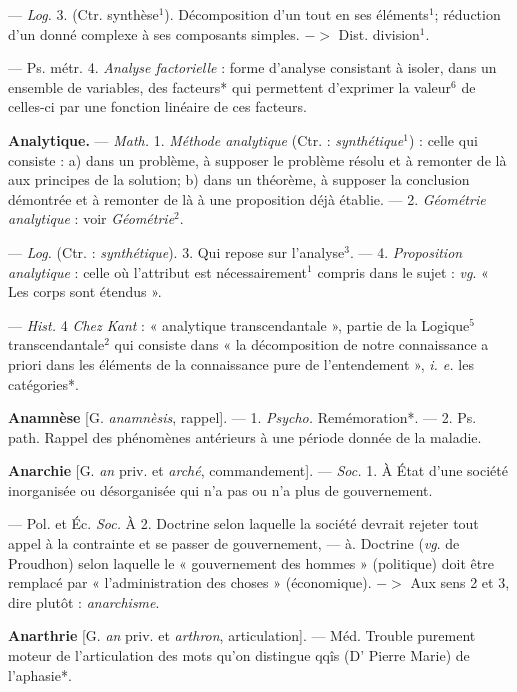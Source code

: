 \begin{itemize}[leftmargin=1cm, label=, itemsep=1pt]
{{{{— \textsf{\textit {Log.}} 3. (Ctr. {\it }synthèse$^1$).
Décomposition d’un tout en ses éléments$^1$; réduction d'un donné
complexe à ses composants simples. $->$ Dist. division$^1$.

— Ps. métr. 4. {\it Analyse factorielle} : forme d'analyse consistant à
isoler, dans un ensemble de variables,
des facteurs* qui permettent d’exprimer la valeur$^6$ de celles-ci par une
fonction linéaire de ces facteurs.

\item {\bf Analytique.} — \textsf{\textit {Math.}} 1. {\it Méthode analytique} (Ctr. : {\it synthétique}$^1$) : celle
qui consiste : a) dans un problème,
à supposer le problème résolu et à
remonter de là aux principes de la
solution; b) dans un théorème, à
supposer la conclusion démontrée et
à remonter de là à une proposition
déjà établie. — 2. {\it Géométrie analytique} : voir {\it Géométrie}$^2$.

— \textsf{\textit {Log.}} (Ctr. : {\it synthétique}). 3. Qui
repose sur l’analyse$^3$. — 4. {\it Proposition analytique} : celle où l’attribut
est nécessairement$^1$ compris dans le
sujet : {\it vg}. « Les corps sont étendus ».

— \textsf{\textit {Hist.}} 4 {\it Chez Kant} : « analytique transcendantale », partie de
la Logique$^5$ transcendantale$^2$ qui
consiste dans « la décomposition de
notre connaissance a priori dans les
éléments de la connaissance pure de
l’entendement », {\it i. e.} les catégories*.

\item {\bf Anamnèse} [G. {\it anamnèsis}, rappel]. —
1. \textsf{\textit {Psycho.}} Remémoration*. — 2. Ps.
path. Rappel des phénomènes antérieurs à une période donnée de la
maladie.

\item {\bf Anarchie} [G. {\it an} priv. et {\it arché}, commandement]. — \textsf{\textit {Soc.}} 1. À État
d’une société inorganisée ou désorganisée qui n’a pas ou n’a plus de
gouvernement.

— Pol. et Éc. \textsf{\textit {Soc.}} À 2. Doctrine
selon laquelle la société devrait
rejeter tout appel à la contrainte et
se passer de gouvernement, — à.
Doctrine ({\it vg}. de Proudhon) selon
laquelle le « gouvernement des
hommes » (politique) doit être remplacé par « l'administration des
choses » (économique). $->$ Aux
sens 2 et 3, dire plutôt : {\it anarchisme}.

\item {\bf Anarthrie} [G. {\it an} priv. et {\it arthron},
articulation]. — Méd. Trouble purement moteur de l'articulation des
mots qu’on distingue qqîs (D' Pierre
Marie) de l’aphasie*.

}}}}
\end{itemize}
